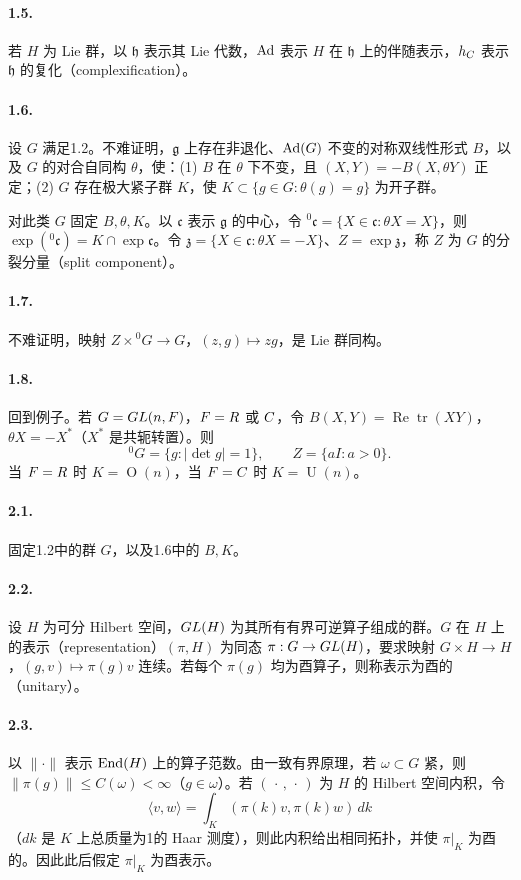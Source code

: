 \paragraph*{1.5.} 若 $H$ 为 Lie 群，以 $\mathfrak h$ 表示其 Lie 代数，$\operatorname{Ad}$ 表示 $H$ 在 $\mathfrak h$ 上的伴随表示，$h_{C}$ 表示 $\mathfrak h$ 的复化（complexification）。
\paragraph*{1.6.} 设 $G$ 满足1.2。不难证明，$\mathfrak g$ 上存在非退化、$\operatorname{Ad}(G)$ 不变的对称双线性形式 $B$，以及 $G$ 的对合自同构 $\theta$，使：(1) $B$ 在 $\theta$ 下不变，且 $(X,Y)=-B(X,\theta Y)$ 正定；(2) $G$ 存在极大紧子群 $K$，使 $K\subset\{g\in G:\theta(g)=g\}$ 为开子群。

对此类 $G$ 固定 $B,\theta,K$。以 $\mathfrak c$ 表示 $\mathfrak g$ 的中心，令 ${}^0\mathfrak c=\{X\in\mathfrak c:\theta X=X\}$，则 $\exp({}^0\mathfrak c)=K\cap\exp\mathfrak c$。令 $\mathfrak z=\{X\in\mathfrak c:\theta X=-X\}$、$Z=\exp\mathfrak z$，称 $Z$ 为 $G$ 的分裂分量（split component）。
\paragraph*{1.7.} 不难证明，映射 $Z\times{}^0G\to G$，$(z,g)\mapsto zg$，是 Lie 群同构。
\paragraph*{1.8.} 回到例子。若 $G=GL(n,F)$，$F=R$ 或 $C$，令 $B(X,Y)=\operatorname{Re}\operatorname{tr}(XY)$，$\theta X=-X^*$（$X^*$ 是共轭转置）。则
\[
 {}^0G=\{g:|\det g|=1\},\qquad Z=\{aI:a>0\}.
\]
当 $F=R$ 时 $K=\operatorname O(n)$，当 $F=C$ 时 $K=\operatorname U(n)$。

\paragraph*{2.1.} 固定1.2中的群 $G$，以及1.6中的 $B,K$。
\paragraph*{2.2.} 设 $H$ 为可分 Hilbert 空间，$GL(H)$ 为其所有有界可逆算子组成的群。$G$ 在 $H$ 上的表示（representation）$(\pi,H)$ 为同态 $\pi:G\to GL(H)$，要求映射 $G\times H\to H$，$(g,v)\mapsto\pi(g)v$ 连续。若每个 $\pi(g)$ 均为酉算子，则称表示为酉的（unitary）。
\paragraph*{2.3.} 以 $\|\cdot\|$ 表示 $\operatorname{End}(H)$ 上的算子范数。由一致有界原理，若 $\omega\subset G$ 紧，则 $\|\pi(g)\|\le C(\omega)<\infty$（$g\in\omega$）。若 $(\,\cdot\,,\,\cdot\,)$ 为 $H$ 的 Hilbert 空间内积，令
\[
 \langle v,w\rangle=\int_K(\pi(k)v,\pi(k)w)\,dk
\]
（$dk$ 是 $K$ 上总质量为1的 Haar 测度），则此内积给出相同拓扑，并使 $\pi|_K$ 为酉的。因此此后假定 $\pi|_K$ 为酉表示。
